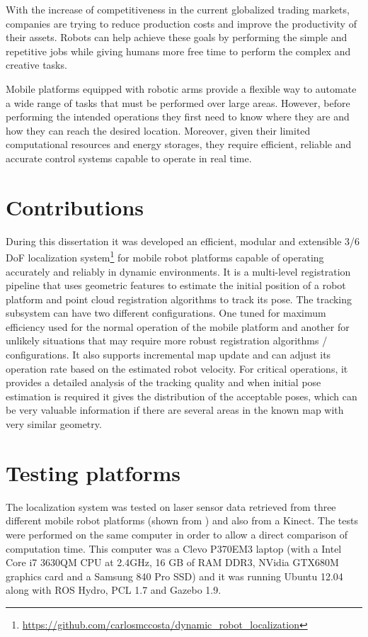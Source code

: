 \documentclass[9pt,a4paper]{extarticle}
\begin{document}
\begin{multicols}{2}
With the increase of competitiveness in the current globalized trading markets, companies are trying to reduce production costs and improve the productivity of their assets. Robots can help achieve these goals by performing the simple and repetitive jobs while giving humans more free time to perform the complex and creative tasks.

Mobile platforms equipped with robotic arms provide a flexible way to automate a wide range of tasks that must be performed over large areas. However, before performing the intended operations they first need to know where they are and how they can reach the desired location. Moreover, given their limited computational resources and energy storages, they require efficient, reliable and accurate control systems capable to operate in real time.



\section{Contributions}

During this dissertation it was developed an efficient, modular and extensible 3/6 DoF localization system\footnote{\url{https://github.com/carlosmccosta/dynamic_robot_localization}} for mobile robot platforms capable of operating accurately and reliably in dynamic environments. It is a multi-level registration pipeline that uses geometric features to estimate the initial position of a robot platform and point cloud registration algorithms to track its pose. The tracking subsystem can have two different configurations. One tuned for maximum efficiency used for the normal operation of the mobile platform and another for unlikely situations that may require more robust registration algorithms / configurations. It also supports incremental map update and can adjust its operation rate based on the estimated robot velocity. For critical operations, it provides a detailed analysis of the tracking quality and when initial pose estimation is required it gives the distribution of the acceptable poses, which can be very valuable information if there are several areas in the known map with very similar geometry.


\section{Testing platforms}

The localization system was tested on laser sensor data retrieved from three different mobile robot platforms (shown from ) and also from a Kinect. The tests were performed on the same computer in order to allow a direct comparison of computation time. This computer was a Clevo P370EM3 laptop (with a Intel Core i7 3630QM CPU at 2.4GHz, 16 GB of RAM DDR3, NVidia GTX680M graphics card and a Samsung 840 Pro SSD) and it was running Ubuntu 12.04 along with ROS Hydro, PCL 1.7 and Gazebo 1.9.


\end{multicols}
\end{document}
